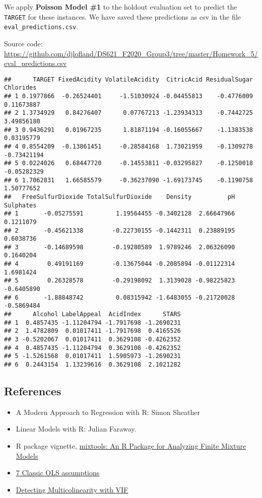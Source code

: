 \documentclass[
]{article}
\providecommand{\tightlist}{%
  \setlength{\itemsep}{0pt}\setlength{\parskip}{0pt}}
\begin{document}
We apply \textbf{Poisson Model \#1} to the holdout evaluation set to
predict the \texttt{TARGET} for these instances. We have saved these
predictions as csv in the file \texttt{eval\_predictions.csv}.

Source code:
\url{https://github.com/djlofland/DS621_F2020_Group3/tree/master/Homework_5/eval_predictions.csv}

\begin{verbatim}
##      TARGET FixedAcidity VolatileAcidity  CitricAcid ResidualSugar   Chlorides
## 1 0.1977866  -0.26524401     -1.51030924 -0.04455813    -0.4776009  0.11673887
## 2 1.3734929   0.84276407      0.07767213 -1.23934313    -0.7442725  3.49856180
## 3 0.9436291   0.01967235      1.81871194 -0.16055667    -1.1383538  0.03195779
## 4 0.8554209  -0.13861451     -0.28584168  1.73021959    -0.1309278 -0.73421194
## 5 0.0224026   0.68447720     -0.14553811 -0.03295827    -0.1250018 -0.05282329
## 6 1.7062831   1.66585579     -0.36237090 -1.69173745    -0.1190758  1.50777652
##   FreeSulfurDioxide TotalSulfurDioxide    Density          pH  Sulphates
## 1       -0.05275591         1.19564455 -0.3402128  2.66647966  0.1211079
## 2       -0.45621338        -0.22730155 -0.1442311  0.23889195  0.6038736
## 3       -0.14689598        -0.19280589  1.9789246  2.06326090  0.1640204
## 4        0.49191169        -0.13675044 -0.2085894 -0.01122314  1.6981424
## 5        0.26328578        -0.29198092  1.3139028 -0.98225823 -0.6405890
## 6       -1.88848742         0.08315942 -1.6483055 -0.21720028 -0.5869484
##      Alcohol LabelAppeal  AcidIndex      STARS
## 1  0.4857435 -1.11204794 -1.7917698 -1.2690231
## 2  1.4782809  0.01017411 -1.7917698  0.4165526
## 3 -0.5202067  0.01017411  0.3629108 -0.4262352
## 4  0.4857435 -1.11204794  0.3629108 -0.4262352
## 5 -1.5261568  0.01017411  1.5905973 -1.2690231
## 6  0.2443154  1.13239616  0.3629108  2.1021282
\end{verbatim}

\hypertarget{references}{%
\subsection{References}\label{references}}

\begin{itemize}
\tightlist
\item
  A Modern Approach to Regression with R: Simon Sheather
\item
  Linear Models with R: Julian Faraway.
\item
  R package vignette,
  \href{https://cran.r-project.org/web/packages/mixtools/vignettes/mixtools.pdf}{mixtools:
  An R Package for Analyzing Finite Mixture Models}
\item
  \href{https://statisticsbyjim.com/regression/ols-linear-regression-assumptions/}{7
  Classic OLS assumptions}
\item
  \href{https://online.stat.psu.edu/stat462/node/180/}{Detecting
  Multicolinearity with VIF}
\end{itemize}
\end{document}
